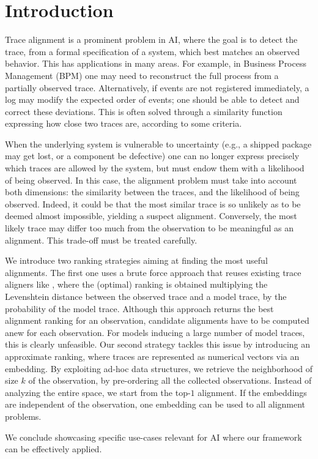 
\section{Introduction}
\label{introduction}

Trace alignment is a prominent problem in AI, where the goal is to detect the trace, from a formal specification of a system,
which best matches an observed behavior. This has applications in many areas. For example, in Business Process Management (BPM)
one may need to reconstruct the full process from a partially observed trace. Alternatively, if events are not registered immediately,
a log may modify the expected order of events; one should be able to detect and correct these deviations. This is often solved
through a similarity function expressing how close two traces are, according to some criteria.

When the underlying system is vulnerable to uncertainty (e.g., a shipped package may get lost, or a component be defective)
one can no longer express precisely which traces are allowed by the system, but must endow them with a likelihood
of being observed. In this case, the alignment problem must take into account both dimensions: the similarity between the
traces, and the likelihood of being observed. Indeed, it could be that the most similar trace is so unlikely as to be deemed almost
impossible, yielding a suspect alignment. Conversely, the most likely trace may differ too much from the observation to be
meaningful as an alignment. This trade-off must be treated carefully.

We introduce two ranking strategies aiming at finding the most useful alignments. The first one uses a brute force approach that
reuses existing trace aligners like \cite{DBLP:conf/edoc/AdriansyahDA11,LeoniM17}, where the (optimal) ranking
is obtained multiplying the Levenshtein distance between the observed trace and a model trace, by the probability of the
model trace. Although this approach returns the best alignment ranking for an observation, candidate alignments have to be computed
anew for each observation. For models inducing a large number of model traces, this is clearly unfeasible. Our second
strategy tackles this issue by introducing an approximate ranking, where traces are represented as numerical vectors via an embedding.
By exploiting ad-hoc data structures, we retrieve the neighborhood of size $k$ of the observation, by pre-ordering all the collected observations. Instead of analyzing the entire space, we start from the top-$1$ alignment. If the embeddings are
independent of the observation, one embedding can be used to all alignment problems.

We conclude showcasing specific use-cases relevant for AI where our framework can be effectively applied. 